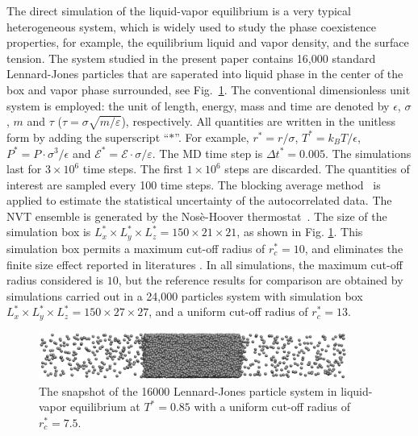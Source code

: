 \documentclass[aps,pre,preprint]{revtex4}
\begin{document}
The direct simulation of the liquid-vapor equilibrium is a very
typical heterogeneous system, which is widely used to study the phase
coexistence properties, for example, the equilibrium liquid and vapor
density, and the surface tension. The system studied in the present
paper contains 16,000 standard Lennard-Jones particles that are
saperated into liquid phase in the center of the box and vapor phase
surrounded, see Fig.~\ref{fig:tmp1}.  The conventional dimensionless
unit system is employed: the unit of length, energy, mass and time are
denoted by $\epsilon$, $\sigma$, $m$ and $\tau$ ($\tau =
\sigma\sqrt{m/\varepsilon}$), respectively.  All quantities are
written in the unitless form by adding the superscript ``$\ast$''.
For example, $r^\ast = r / \sigma$, $T^\ast = k_BT / \epsilon$,
$P^\ast = P\cdot \sigma^3 / \epsilon$ and $\mathcal E^\ast = \mathcal
E\cdot\sigma/\varepsilon$.  The MD time step {is} $\Delta t^\ast =
0.005$. The simulations last for $3\times 10^6$ time steps. The first
$1\times 10^6$ steps are discarded. The quantities of interest are
sampled every 100 time steps. The blocking average
method~\cite{flyvbjerg1989error} is applied to estimate the
statistical uncertainty of the autocorrelated data. The NVT ensemble
is generated by the Nos\`e-Hoover thermostat~\cite{nose1984molecular,
  hoover1985canonical}.  The size of the simulation box is $L_x^\ast
\times L_y^\ast \times L_z^\ast = 150\times 21\times 21$, as shown in
Fig. \ref{fig:tmp1}. This simulation box permits a maximum cut-off
radius of $r_c^\ast = 10$, and eliminates the finite size effect
reported in literatures \cite{chen1995area, orea2005oscillatory,
  biscay2009calculation}. In all simulations, the maximum cut-off
radius considered is $10$, but the reference results for comparison
are obtained by simulations carried out in a 24,000 particles system
with simulation box $L_x^\ast \times L_y^\ast \times L_z^\ast =
150\times 27\times 27$, and a uniform cut-off radius of $r_c^\ast =
13$.

\begin{figure}
  \centering
  \includegraphics[width=0.9\textwidth]{fig/t0.85-n16000-rc07.5uni/confout.eps}
  \caption{The snapshot of the 16000 Lennard-Jones particle system in
    liquid-vapor equilibrium at $T^\ast=0.85$ with a uniform cut-off
    radius of $r_c^\ast = 7.5$.}
  \label{fig:tmp1}
\end{figure}
\end{document}
